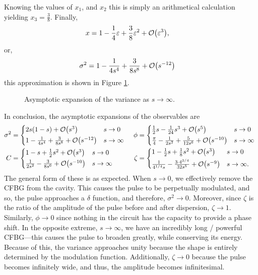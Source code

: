 Knowing the values of $x_1$, and $x_2$ this is simply an arithmetical calculation yielding $x_3 = \frac{3}{8}$. Finally,
\begin{align*}
x &= 1 - \frac{1}{4}\eps + \frac{3}{8}\eps^2 + \bigO{\eps^3},
\end{align*}
or,
\begin{align*}
\sigma^2 &= 1 - \frac{1}{4s^4} + \frac{3}{8s^8} + \bigO{s^{-12}}
\end{align*}
this approximation is shown in Figure \ref{fig:limsinfty}. \\
\begin{figure}[tbp]

\caption{Asymptotic expansion of the variance as $s \rightarrow \infty$.}
\label{fig:limsinfty}
\end{figure}

In conclusion, the asymptotic expansions of the observables are
\begin{align*}
\sigma^2 &=
\begin{cases*}
2s(1 - s) + \bigO{s^3} & $s \rightarrow 0$ \\
1 - \frac{1}{4s^4} + \frac{3}{8s^8} + \bigO{s^{-12}} & $s \rightarrow \infty$
\end{cases*}
& \phi &=
\begin{cases*}
\frac{1}{2}s - \frac{1}{24}s^3 + \bigO{s^5} & $s \rightarrow 0$ \\
\frac{\pi}{4} - \frac{1}{2s^2} + \frac{5}{12s^6} + \bigO{s^{-10}} & $s \rightarrow \infty$
\end{cases*} \\
C &=
\begin{cases*}
1 - s + \frac{1}{2}s^2 + \bigO{s^3} & $s \rightarrow 0$ \\
\frac{1}{2s^2} - \frac{3}{8s^6} + \bigO{s^{-10}} & $s \rightarrow \infty$
\end{cases*}
& \zeta &=
\begin{cases*}
1 - \frac{1}{2}s + \frac{1}{8}s^2 + \bigO{s^3} & $s \rightarrow 0$ \\
\frac{1}{4^{1/4}s} - \frac{3 \cdot 4^{3/4}}{32 s^5} + \bigO{s^{-9}} & $s \rightarrow \infty$.
\end{cases*}
\end{align*}
The general form of these is as expected. When $s \rightarrow 0$, we effectively remove the CFBG from the cavity. This causes the pulse to be perpetually modulated, and so, the pulse approaches a $\delta$ function, and therefore, $\sigma^2 \rightarrow 0$. Moreover, since $\zeta$ is the ratio of the amplitude of the pulse before and after dispersion, $\zeta \rightarrow 1$. Similarly, $\phi \rightarrow 0$ since nothing in the circuit has the capacity to provide a phase shift. In the opposite extreme, $s \rightarrow \infty$, we have an incredibly long / powerful CFBG---this causes the pulse to broaden greatly, while conserving its energy. Because of this, the variance approaches unity because the shape is entirely determined by the modulation function. Additionally, $\zeta \rightarrow 0$ because the pulse becomes infinitely wide, and thus, the amplitude becomes infinitesimal.








